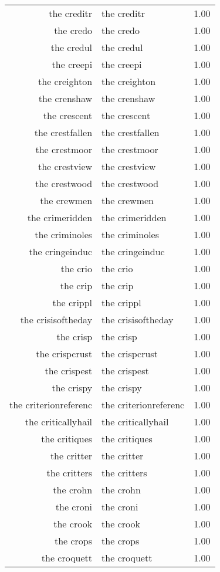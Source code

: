\begin{table}[ht]
\begin{tabular}{rlr}
  the creditr & the creditr & 1.00 \\ 
  the credo & the credo & 1.00 \\ 
  the credul & the credul & 1.00 \\ 
  the creepi & the creepi & 1.00 \\ 
  the creighton & the creighton & 1.00 \\ 
  the crenshaw & the crenshaw & 1.00 \\ 
  the crescent & the crescent & 1.00 \\ 
  the crestfallen & the crestfallen & 1.00 \\ 
  the crestmoor & the crestmoor & 1.00 \\ 
  the crestview & the crestview & 1.00 \\ 
  the crestwood & the crestwood & 1.00 \\ 
  the crewmen & the crewmen & 1.00 \\ 
  the crimeridden & the crimeridden & 1.00 \\ 
  the criminoles & the criminoles & 1.00 \\ 
  the cringeinduc & the cringeinduc & 1.00 \\ 
  the crio & the crio & 1.00 \\ 
  the crip & the crip & 1.00 \\ 
  the crippl & the crippl & 1.00 \\ 
  the crisisoftheday & the crisisoftheday & 1.00 \\ 
  the crisp & the crisp & 1.00 \\ 
  the crispcrust & the crispcrust & 1.00 \\ 
  the crispest & the crispest & 1.00 \\ 
  the crispy & the crispy & 1.00 \\ 
  the criterionreferenc & the criterionreferenc & 1.00 \\ 
  the criticallyhail & the criticallyhail & 1.00 \\ 
  the critiques & the critiques & 1.00 \\ 
  the critter & the critter & 1.00 \\ 
  the critters & the critters & 1.00 \\ 
  the crohn & the crohn & 1.00 \\ 
  the croni & the croni & 1.00 \\ 
  the crook & the crook & 1.00 \\ 
  the crops & the crops & 1.00 \\ 
  the croquett & the croquett & 1.00 \\ 

\end{tabular}
\end{table}
